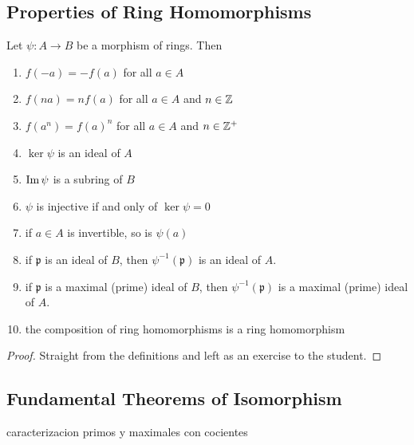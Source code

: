 \documentclass[11pt,a4paper]{article}
\begin{document}
\subsection{Properties of Ring Homomorphisms}

\begin{prop}
Let \(\psi\colon A\to B\) be a morphism of rings.
Then
\begin{enumerate}[label=(\roman*)]
\item \( f(-a) = -f(a) \) for all \(a\in A\)
\item \( f(na) = nf(a) \)  for all \(a\in A\) and \(n\in \mathbb{Z}\)
\item \( f(a^n) = f(a)^n \)  for all \(a\in A\) and \(n\in \mathbb{Z}^+\)

\item \(\ker \psi \) is an ideal of \(A\)
\item \(\operatorname{Im} \psi\) is a subring of \(B\)
\item \(\psi\) is injective if and only of \(\ker \psi = 0\)
\item if \(a\in A\) is invertible, so is \(\psi(a)\)
\item if \(\mathfrak{p}\) is an ideal of \(B\), then \(\psi^{-1}(\mathfrak{p})\) is an ideal of \(A\).
\item if \(\mathfrak{p}\) is a maximal (prime) ideal of \(B\), then \(\psi^{-1}(\mathfrak{p})\) is a maximal (prime) ideal of \(A\).
\item the composition of ring homomorphisms is a ring homomorphism
\end{enumerate}
\end{prop}

\begin{proof}
    Straight from the definitions and left as an exercise to the student.
\end{proof}

\pagebreak
\subsection{Fundamental Theorems of Isomorphism}

caracterizacion primos y maximales con cocientes
\end{document}
